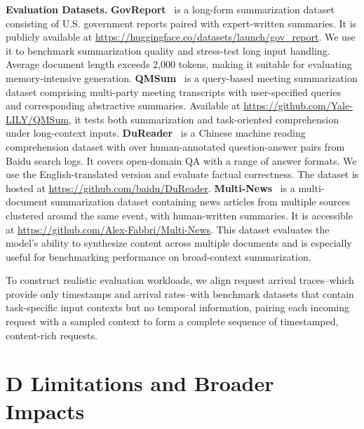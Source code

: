\noindent\textbf{Evaluation Datasets.}
\textbf{GovReport}~\cite{gov_report} is a long-form summarization dataset consisting of U.S. government reports paired with expert-written summaries. It is publicly available at \href{https://huggingface.co/datasets/launch/gov_report}{\url{https://huggingface.co/datasets/launch/gov\_report}}. We use it to benchmark summarization quality and stress-test long input handling. Average document length exceeds 2,000 tokens, making it suitable for evaluating memory-intensive generation.
\textbf{QMSum}~\cite{zhong2021qmsum} is a query-based meeting summarization dataset comprising multi-party meeting transcripts with user-specified queries and corresponding abstractive summaries. Available at \href{https://github.com/Yale-LILY/QMSum}{\url{https://github.com/Yale-LILY/QMSum}}, it tests both summarization and task-oriented comprehension under long-context inputs.
\textbf{DuReader}~\cite{he2017dureader} is a Chinese machine reading comprehension dataset with over human-annotated question-answer pairs from Baidu search logs. It covers open-domain QA with a range of answer formats. We use the English-translated version and evaluate factual correctness. The dataset is hosted at \href{https://github.com/baidu/DuReader}{\url{https://github.com/baidu/DuReader}}.
\textbf{Multi-News}~\cite{fabbri2019multi} is a multi-document summarization dataset containing news articles from multiple sources clustered around the same event, with human-written summaries. It is accessible at \href{https://github.com/Alex-Fabbri/Multi-News}{\url{https://github.com/Alex-Fabbri/Multi-News}}. This dataset evaluates the model’s ability to synthesize content across multiple documents and is especially useful for benchmarking performance on broad-context summarization.

To construct realistic evaluation workloads, we align request arrival traces--which provide only timestamps and arrival rates--with benchmark datasets that contain task-specific input contexts but no temporal information, pairing each incoming request with a sampled context to form a complete sequence of timestamped, content-rich requests.


\section*{D \quad Limitations and Broader Impacts}
\label{sec:limit_impact}

